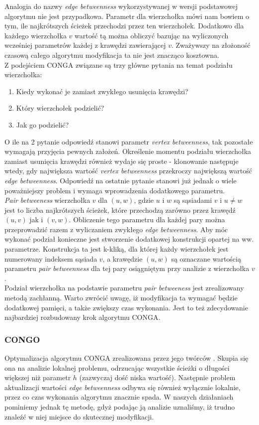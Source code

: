 \documentclass{article}
\begin{document}
Analogia do nazwy \textit{edge betweenness} wykorzystywanej w wersji podstawowej algorytmu nie jest przypadkowa. Parametr dla wierzchołka mówi nam bowiem o tym, ile najkrótszych ścieżek przechodzi przez ten wierzchołek. Dodatkowo dla każdego wierzchołka ${v}$ wartość tą można obliczyć bazując na wyliczonych wcześniej parametrów każdej z krawędzi zawierającej ${v}$. Zważywszy na złożoność czasową całego algorytmu modyfikacja ta nie jest znacząco kosztowna.\\

Z podejściem CONGA związane są trzy główne pytania na temat podziału wierzchołka:
\begin{enumerate}
\item Kiedy wykonać je zamiast zwykłego usunięcia krawędzi?
\item Który wierzchołek podzielić?
\item Jak go podzielić?
\end{enumerate} 

O ile na 2 pytanie odpowiedź stanowi parametr \textit{vertex betweenness}, tak pozostałe wymagają przyjęcia pewnych założeń. Określenie momentu podziału wierzchołka zamiast usunięcia krawędzi również wydaje się proste - klonowanie następuje wtedy, gdy największa wartość \textit{vertex betweenness} przekroczy największą wartość \textit{edge betweenness}. Odpowiedź na ostatnie pytanie stanowi już jednak o wiele poważniejszy problem i wymaga wprowadzenia dodatkowego parametru.\\

\textit{Pair betweeness} wierzchołka $v$ dla $(u,w)$, gdzie $u$ i $w$ są sąsiadami $v$ i $u \neq w$ jest to liczba najkrótszych ścieżek, które przechodzą zarówno przez krawędź $(u,v)$ jak i $(v,w)$. Obliczenie tego parametru dla każdej pary można przeprowadzić razem z wyliczaniem zwykłego \textit{edge betweenness}. Aby móc wykonać podział konieczne jest stworzenie dodatkowej konstrukcji opartej na ww. parametrze. Konstrukcja ta jest k-kliką, dla której każdy wierzchołek jest numerowany indeksem sąsiada $v$, a krawędzie $(u,w)$ są oznaczane wartością parametru \textit{pair betweenness} dla tej pary osiągniętym przy analizie z wierzchołka $v$.\\

Podział wierzchołka na podstawie parametru \textit{pair betweeness} jest zrealizowany metodą zachłanną. Warto zwrócić uwagę, iż modyfikacja ta wymagać będzie dodatkowej pamięci, a także zwiększy czas wykonania. Jest to też zdecydowanie najbardziej rozbudowany krok algorytmu CONGA.
\subsubsection{CONGO}
Optymalizacja algorytmu CONGA zrealizowana przez jego twórców \cite{is-paper3}. Skupia się ona na analizie lokalnej problemu, odrzucając wszystkie ścieżki o długości większej niż parametr $h$ (zazwyczaj dość niska wartość). Następnie problem aktualizacji wartości \textit{edge betweenness} odbywa się również wyłącznie lokalnie, przez co czas wykonania algorytmu znacznie spada. W naszych działaniach pominiemy jednak tę metodę, gdyż podając ją analizie uznaliśmy, iż trudno znaleźć w niej miejsce do skutecznej modyfikacji.
\end{document}

